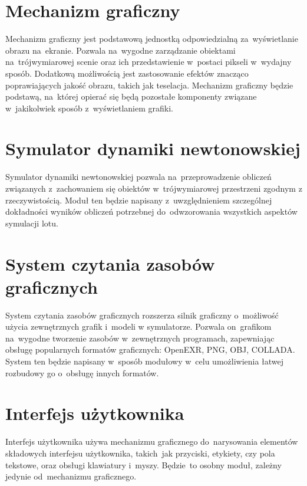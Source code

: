 \documentclass{mwrep}
\begin{document}
\section{Mechanizm graficzny}
Mechanizm graficzny jest podstawową jednostką odpowiedzialną za~wyświetlanie obrazu na~ekranie. Pozwala na~wygodne zarządzanie obiektami na~trójwymiarowej scenie oraz ich przedstawienie w~postaci pikseli w~wydajny sposób. Dodatkową możliwością jest zastosowanie efektów znacząco poprawiających jakość obrazu, takich jak teselacja\footnotemark[1]{}. Mechanizm graficzny będzie podstawą, na~której opierać się będą pozostałe komponenty związane w~jakikolwiek sposób z~wyświetlaniem grafiki.


\section{Symulator dynamiki newtonowskiej}
Symulator dynamiki newtonowskiej pozwala na~przeprowadzenie obliczeń związanych z~zachowaniem się obiektów w~trójwymiarowej przestrzeni zgodnym z rzeczywistością. Moduł ten będzie napisany \linebreak z~uwzględnieniem szczególnej dokładności wyników obliczeń potrzebnej do~odwzorowania wszystkich aspektów symulacji lotu.

\section{System czytania zasobów graficznych}
System czytania zasobów graficznych rozszerza silnik graficzny o~możliwość użycia zewnętrznych grafik i~modeli w symulatorze. Pozwala on~grafikom na~wygodne tworzenie zasobów w~zewnętrznych programach, zapewniając obsługę popularnych formatów graficznych: OpenEXR, PNG, OBJ, COLLADA. System ten będzie napisany w~sposób modułowy w~celu umożliwienia łatwej rozbudowy go o~obsługę innych formatów.

\section{Interfejs użytkownika}
Interfejs użytkownika używa mechanizmu graficznego do~narysowania elementów składowych interfejsu użytkownika, takich~jak przyciski, etykiety, czy pola tekstowe, oraz obsługi klawiatury i~myszy. Będzie~to \linebreak osobny moduł, zależny jedynie od~mechanizmu graficznego.
\end{document}

